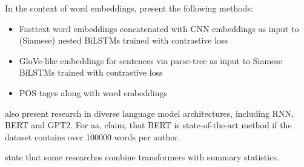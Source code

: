In the context of word embeddings, \citet{tyo_state_2022} present the following methods:
\begin{itemize}
    \item Fasttext word embeddings concatenated with CNN embeddings as input to (Siamese) nested BiLSTMs trained with contrastive loss
    \item GloVe-like embeddings for sentences via parse-tree as input to Siamese BiLSTMs trained with contrastive loss
    \item POS tages along with word embeddings
\end{itemize}

\citet{tyo_state_2022} also present research in diverse language model architectures, including RNN, BERT and GPT2.
For \ac{aa}, \citet{tyo_state_2022} claim, that BERT is state-of-the-art method if the dataset contains over 100000 words per author.

\citet{tyo_state_2022} state that some researches combine transformers with summary statistics.
